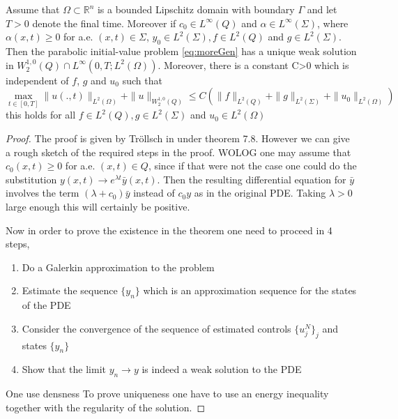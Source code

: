 \begin{theorem} Assume that $\Omega \subset \mathbb{R}^n$ is a bounded Lipschitz domain with boundary $\Gamma$ and let $T>0$ denote the final time. Moreover if $c_0 \in L^{\infty}(Q)$ and $\alpha \in L^{\infty}(\Sigma)$, where $\alpha(x,t) \geq 0$ for a.e. $(x,t) \in \Sigma$, $y_0 \in L^2(\Sigma), f \in L^2(Q)$ and $g \in L^2(\Sigma)$. Then the parabolic initial-value problem \eqref{eq:moreGen} has a unique weak solution in $W_2^{1,0}(Q)\cap L^{\infty}(0,T;L^2(\Omega))$. Moreover, there is a constant C>0 which is independent of $f$, $g$ and $u_0$ such that 
\begin{equation*}
    \max_{t \in [0,T]}\|u(.,t)\|_{L^2(\Omega)} + \|u\|_{W_2^{1,0}(Q)} \leq C(\|f\|_{L^2(Q)} + \|g\|_{L^2(\Sigma)} + \|u_0\|_{L^2(\Omega)})
\end{equation*}
this holds for all $f \in L^2(Q), g \in L^2(\Sigma)$ and $u_0 \in L^2(\Omega)$
\end{theorem}

\begin{proof}
The proof is given by Tröllsch in \cite{optimalControl} under theorem 7.8. However we can give a rough sketch of the required steps in the proof. WOLOG one may assume that $c_0(x,t)\geq 0$ for a.e. $(x,t) \in Q$, since if that were not the case one could do the substitution $y(x,t) \rightarrow e^{\lambda t}\bar{y}(x,t)$. Then the resulting differential equation for $\bar{y}$ involves the term $(\lambda + c_0)\bar{y}$ instead of $c_0y$ as in the original PDE. Taking $\lambda >0$ large enough this will certainly be positive. 

Now in order to prove the existence in the theorem one need to proceed in 4 steps,
\begin{enumerate}
    \item Do a Galerkin approximation to the problem
    \item Estimate the sequence $\{y_n \}$ which is an approximation sequence for the states of the PDE
    \item Consider the convergence of the sequence of estimated controls $\{u_j^N\}_j$ and states $\{ y_n \}$
    \item Show that the limit $y_n \rightarrow y$ is indeed a weak solution to the PDE
\end{enumerate}
One use densness
To prove uniqueness one have to use an energy inequality together with the regularity of the solution.
\end{proof}


